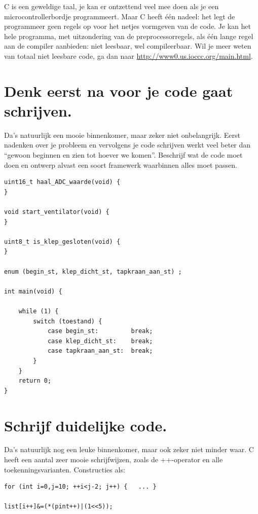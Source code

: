 \documentclass[12pt,a4paper,final,oneside,fleqn]{article}
\begin{document}
C is een geweldige taal, je kan er ontzettend veel mee doen als je een
microcontrollerbordje programmeert. Maar C heeft \'{e}\'{e}n nadeel: het
legt de programmeer geen regels op voor het netjes vormgeven van de code.
Je kan het hele programma, met uitzondering van de preprocessorregels, als
\'{e}\'{e}n lange regel aan de compiler aanbieden: niet leesbaar, wel
compileerbaar. Wil je meer weten van totaal niet leesbare code, ga dan naar
\url{http://www0.us.ioccc.org/main.html}.

\newpage
\section{Denk eerst na voor je code gaat schrijven.}

Da's natuurlijk een mooie binnenkomer, maar zeker niet onbelangrijk. Eerst
nadenken over je probleem en vervolgens je code schrijven werkt veel beter
dan ``gewoon beginnen en zien tot hoever we komen''. Beschrijf wat de code
moet doen en ontwerp alvast een soort framewerk waarbinnen alles moet passen.

\begin{lstlisting}[style=numbers,caption=Voorbeeld van een framework]
uint16_t haal_ADC_waarde(void) {
}

void start_ventilator(void) {
}

uint8_t is_klep_gesloten(void) {
}

enum (begin_st, klep_dicht_st, tapkraan_aan_st) ;

int main(void) {

	while (1) {
		switch (toestand) {
			case begin_st:         break;
			case klep_dicht_st:    break;
			case tapkraan_aan_st:  break;
		}
	}
	return 0;
}
\end{lstlisting}


\section{Schrijf duidelijke code.}

Da's natuurlijk nog een leuke binnenkomer, maar ook zeker niet minder waar.
C heeft een aantal zeer mooie schrijfwijzen, zoals de ++-operator en alle
toekenningsvarianten. Constructies als:

\begin{lstlisting}[style=nonumbers,belowcaptionskip=-12pt]
for (int i=0,j=10; ++i<j-2; j++) {	 ... }

list[i++]&=(*(pint++)|(1<<5));
\end{lstlisting}
\end{document}
